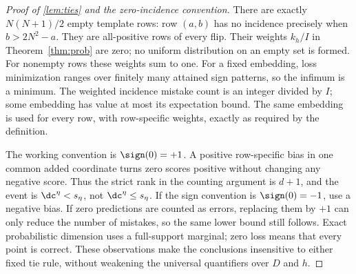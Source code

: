 \begin{proof}[Proof of \cref{lem:ties} and the zero-incidence convention]
There are exactly $N(N+1)/2$ empty template rows: row $(a,b)$ has no incidence precisely when $b>2N^2-a$. They are all-positive rows of every flip. Their weights $k_h/I$ in Theorem~\ref{thm:prob} are zero; no uniform distribution on an empty set is formed. For nonempty rows these weights sum to one. For a fixed embedding, loss minimization ranges over finitely many attained sign patterns, so the infimum is a minimum. The weighted incidence mistake count is an integer divided by $I$; some embedding has value at most its expectation bound. The same embedding is used for every row, with row-specific weights, exactly as required by the definition.

The working convention is $\sign(0)=+1$. A positive row-specific bias in one common added coordinate turns zero scores positive without changing any negative score. Thus the strict rank in the counting argument is $d+1$, and the event is $\dc^\eta<s_\eta$, not $\dc^\eta\le s_\eta$. If the sign convention is $\sign(0)=-1$, use a negative bias. If zero predictions are counted as errors, replacing them by $+1$ can only reduce the number of mistakes, so the same lower bound still follows. Exact probabilistic dimension uses a full-support marginal; zero loss means that every point is correct. These observations make the conclusions insensitive to either fixed tie rule, without weakening the universal quantifiers over $D$ and $h$.
\end{proof}
